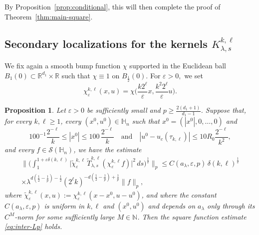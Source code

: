 \documentclass[leqno]{amsart}
\newtheorem{proposition}[theorem]{Proposition}
\theoremstyle{definition}
\theoremstyle{remark}
\numberwithin{equation}{section}
\newcommand{\R}{\mathbb{R}}
\newcommand{\N}{\mathbb{N}}
\newcommand\bbH{{\mathbb {H}}}
\newcommand\ve{{\varepsilon}}
\begin{document}
By Proposition~\ref{prop:conditional}, this will then complete the proof of  Theorem~\ref{thm:main-square}.

\subsection{Secondary  localizations for the kernels $K_{\lambda,s}^{k,\ell}$}


We fix again a smooth bump function $\chi$ supported in the Euclidean ball $B_1(0)\subset \R^{d_1}\times \R$ such that $\chi\equiv 1$ on $B_{\frac{1}{2}}(0).$ For $\ve>0,$ we  set
\[
\chi^{k,\ell}_\ve(x,u)=\chi\Big(\frac{k 2^\ell}{\ve}x, \frac{k^2 2^\ell}{\ve}u\Big).
\]

\begin{proposition}\label{prop:localization-ii}
Let $\ve>0$ be sufficiently small and $p\ge \frac{2(d_1+1)}{d_1-1}$. Suppose that, for every $k,\ell\ge 1$, every $(x^0,u^0)\in\bbH_n$ such that
$x^0=(|x^0|,0,\dots,0)$ and
\begin{equation}\label{essentsupp}
100^{-1}\frac{2^{-\ell}}{k} \le |x^0| \le 100\,\frac{2^{-\ell}}{k}
\quad\text{and}\quad
|u^0-u_c(\tau_{k,\ell})| \le 10R_0\frac{2^{-\ell}}{k^2},
\end{equation}
and every $f\in\mathcal S(\bbH_n)$, we have the estimate
\begin{multline}\label{loc-kl}
\Big\|\Big(
\int_1^{1+\ve\delta(k,\ell)}\big|\tilde\chi^{k,\ell}_\ve\,\tilde T_{\lambda,s}^{k,\ell}(\chi^{k,\ell}_\ve f)
\big|^2\,ds\Big)^{\frac12}\Big\|_p
\le C(a_\lambda,\ve,p)\, \delta(k,\ell)^{\frac12} \\
\times \lambda^{d(\frac12-\frac1p)-\frac12}
(2^\ell k)^{-d(\frac12-\frac1p)+\frac1p}
\|f\|_p,
\end{multline}
where $\tilde\chi^{k,\ell}_\ve(x,u):=\chi^{k,\ell}_\ve(x-x^0,u-u^0)$, and where the constant $C(a_\lambda,\ve,p)$ is uniform in
$k,\ell$ and $(x^0,u^0)$ and depends on $a_\lambda$ only through its $C^M$-norm for some sufficiently large $M\in\N$.
Then the square function estimate \eqref{eq:inter-Lp} holds.
\end{proposition}
\end{document}
